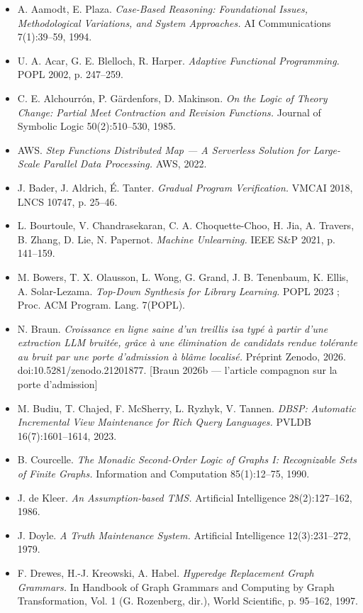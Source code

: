 \documentclass[11pt]{article}
\begin{document}
\begin{itemize}
\item A. Aamodt, E. Plaza. \emph{Case-Based Reasoning: Foundational Issues, Methodological Variations, and System Approaches.} AI Communications 7(1):39–59, 1994.
\item U. A. Acar, G. E. Blelloch, R. Harper. \emph{Adaptive Functional Programming.} POPL 2002, p. 247–259.
\item C. E. Alchourrón, P. Gärdenfors, D. Makinson. \emph{On the Logic of Theory Change: Partial Meet Contraction and Revision Functions.} Journal of Symbolic Logic 50(2):510–530, 1985.
\item AWS. \emph{Step Functions Distributed Map — A Serverless Solution for Large-Scale Parallel Data Processing.} AWS, 2022.
\item J. Bader, J. Aldrich, É. Tanter. \emph{Gradual Program Verification.} VMCAI 2018, LNCS 10747, p. 25–46.
\item L. Bourtoule, V. Chandrasekaran, C. A. Choquette-Choo, H. Jia, A. Travers, B. Zhang, D. Lie, N. Papernot. \emph{Machine Unlearning.} IEEE S\&P 2021, p. 141–159.
\item M. Bowers, T. X. Olausson, L. Wong, G. Grand, J. B. Tenenbaum, K. Ellis, A. Solar-Lezama. \emph{Top-Down Synthesis for Library Learning.} POPL 2023 ; Proc. ACM Program. Lang. 7(POPL).
\item N. Braun. \emph{Croissance en ligne saine d'un treillis isa typé à partir d'une extraction LLM bruitée, grâce à une élimination de candidats rendue tolérante au bruit par une porte d'admission à blâme localisé.} Préprint Zenodo, 2026. doi:10.5281/zenodo.21201877. [Braun 2026b — l'article compagnon sur la porte d'admission]
\item M. Budiu, T. Chajed, F. McSherry, L. Ryzhyk, V. Tannen. \emph{DBSP: Automatic Incremental View Maintenance for Rich Query Languages.} PVLDB 16(7):1601–1614, 2023.
\item B. Courcelle. \emph{The Monadic Second-Order Logic of Graphs I: Recognizable Sets of Finite Graphs.} Information and Computation 85(1):12–75, 1990.
\item J. de Kleer. \emph{An Assumption-based TMS.} Artificial Intelligence 28(2):127–162, 1986.
\item J. Doyle. \emph{A Truth Maintenance System.} Artificial Intelligence 12(3):231–272, 1979.
\item F. Drewes, H.-J. Kreowski, A. Habel. \emph{Hyperedge Replacement Graph Grammars.} In Handbook of Graph Grammars and Computing by Graph Transformation, Vol. 1 (G. Rozenberg, dir.), World Scientific, p. 95–162, 1997.

\end{itemize}
\end{document}
